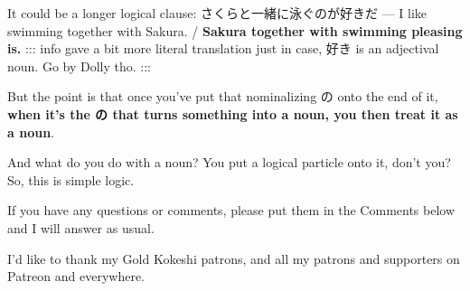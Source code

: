It could be a longer logical clause: さくらと一緒に泳ぐのが好きだ --- I like swimming together with Sakura. / {\bf Sakura together with swimming pleasing is.} ::: info gave a bit more literal translation just in case, 好き is an adjectival noun. Go by Dolly tho. ::: {}

But the point is that once you've put that nominalizing の onto the end of it, {\bf when it's the の that turns something into a noun, you then treat it as a noun}.

And what do you do with a noun? You put a logical particle onto it, don't you? So, this is simple logic.

If you have any questions or comments, please put them in the Comments below and I will answer as usual.

I'd like to thank my Gold Kokeshi patrons, and all my patrons and supporters on Patreon and everywhere.

\stopsectionlevel

\stopsectionlevel
